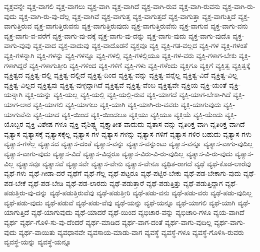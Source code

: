 {ವ್ಯಕ್ತವನ್ನೇ
ವ್ಯಕ್ತ-ವಾಗಲಿ
ವ್ಯಕ್ತ-ವಾಗಲು
ವ್ಯಕ್ತ-ವಾಗಿ
ವ್ಯಕ್ತ-ವಾಗಿದೆ
ವ್ಯಕ್ತ-ವಾಗಿ-ರುವ
ವ್ಯಕ್ತ-ವಾಗಿ-ರುವನು
ವ್ಯಕ್ತ-ವಾಗಿ-ರು-ವುದು
ವ್ಯಕ್ತ-ವಾಗಿ-ರು-ವು-ದೆಲ್ಲ
ವ್ಯಕ್ತ-ವಾಗಿವೆ
ವ್ಯಕ್ತ-ವಾಗುತ್ತ
ವ್ಯಕ್ತ-ವಾಗುತ್ತದೆ
ವ್ಯಕ್ತ-ವಾಗುತ್ತಾ
ವ್ಯಕ್ತ-ವಾಗುತ್ತಿದೆ
ವ್ಯಕ್ತ-ವಾಗುತ್ತಿರುವ
ವ್ಯಕ್ತ-ವಾಗುತ್ತಿರುವನು
ವ್ಯಕ್ತ-ವಾಗುತ್ತಿರುವುದು
ವ್ಯಕ್ತ-ವಾಗುತ್ತಿರುವೆನು
ವ್ಯಕ್ತ-ವಾಗುವ
ವ್ಯಕ್ತ-ವಾಗು-ವನು
ವ್ಯಕ್ತ-ವಾಗು-ವ-ವರೆಗೆ
ವ್ಯಕ್ತ-ವಾಗು-ವು-ದಕ್ಕೆ
ವ್ಯಕ್ತ-ವಾಗು-ವು-ದನ್ನು
ವ್ಯಕ್ತ-ವಾಗು-ವುದು
ವ್ಯಕ್ತ-ವಾಗು-ವುದೊ
ವ್ಯಕ್ತ-ವಾಗು-ವುವು
ವ್ಯಕ್ತ-ವಾದ
ವ್ಯಕ್ತ-ವಾದುವು
ವ್ಯಕ್ತ-ವಾದೊಡನೆ
ವ್ಯಕ್ತವೂ
ವ್ಯಕ್ತಿ
ವ್ಯಕ್ತಿ-ಗತ-ವಲ್ಲದ
ವ್ಯಕ್ತಿ-ಗಳ
ವ್ಯಕ್ತಿ-ಗಳಂತೆ
ವ್ಯಕ್ತಿ-ಗಳನ್ನಾಗಿ
ವ್ಯಕ್ತಿ-ಗಳನ್ನು
ವ್ಯಕ್ತಿ-ಗಳನ್ನೂ
ವ್ಯಕ್ತಿ-ಗಳಲ್ಲಿ
ವ್ಯಕ್ತಿ-ಗಳಲ್ಲಿಯೂ
ವ್ಯಕ್ತಿ-ಗಳ-ವರು
ವ್ಯಕ್ತಿ-ಗಳಾಗ-ಬೇಕು
ವ್ಯಕ್ತಿ-ಗಳಾಗಿದ್ದರೆ
ವ್ಯಕ್ತಿ-ಗಳಾಗುತ್ತೀರಿ
ವ್ಯಕ್ತಿ-ಗಳಿಂದ
ವ್ಯಕ್ತಿ-ಗಳಿಗೆ
ವ್ಯಕ್ತಿ-ಗಳು
ವ್ಯಕ್ತಿ-ಗಳೆಂದು
ವ್ಯಕ್ತಿಗೂ
ವ್ಯಕ್ತಿಗೆ
ವ್ಯಕ್ತಿತ್ವ
ವ್ಯಕ್ತಿತ್ವಕ್ಕೆ
ವ್ಯಕ್ತಿತ್ವದ
ವ್ಯಕ್ತಿತ್ವ-ದಲ್ಲಿ
ವ್ಯಕ್ತಿತ್ವ-ದಲ್ಲಿದೆ
ವ್ಯಕ್ತಿತ್ವ-ದಿಂದ
ವ್ಯಕ್ತಿತ್ವ-ವನ್ನು
ವ್ಯಕ್ತಿತ್ವ-ವನ್ನೆಲ್ಲ
ವ್ಯಕ್ತಿತ್ವ-ವಿದೆ
ವ್ಯಕ್ತಿತ್ವ-ವಿಲ್ಲ
ವ್ಯಕ್ತಿತ್ವ-ವಿಲ್ಲದ
ವ್ಯಕ್ತಿತ್ವವು
ವ್ಯಕ್ತಿತ್ವ-ವುಳ್ಳದ್ದಾಗಿದೆ
ವ್ಯಕ್ತಿತ್ವವೆ
ವ್ಯಕ್ತಿತ್ವ-ವೆಂಬ
ವ್ಯಕ್ತಿತ್ವವೇ
ವ್ಯಕ್ತಿಯ
ವ್ಯಕ್ತಿ-ಯಂತೆ
ವ್ಯಕ್ತಿ-ಯನ್ನಾಗಿ
ವ್ಯಕ್ತಿ-ಯನ್ನು
ವ್ಯಕ್ತಿ-ಯಲ್ಲ
ವ್ಯಕ್ತಿ-ಯಲ್ಲಿ
ವ್ಯಕ್ತಿ-ಯಲ್ಲಿ-ರುವ
ವ್ಯಕ್ತಿ-ಯಾಗದೆ
ವ್ಯಕ್ತಿ-ಯಾಗ-ಬೇಕಾ-ಗಿದೆ
ವ್ಯಕ್ತಿ-ಯಾಗ-ಲಾರ
ವ್ಯಕ್ತಿ-ಯಾಗಲಿ
ವ್ಯಕ್ತಿ-ಯಾಗಲು
ವ್ಯಕ್ತಿ-ಯಾಗಿ
ವ್ಯಕ್ತಿ-ಯಾಗಿ-ರು-ವವರು
ವ್ಯಕ್ತಿ-ಯಾಗುವುದು
ವ್ಯಕ್ತಿ-ಯಾಗುವೆನು
ವ್ಯಕ್ತಿ-ಯಾದ
ವ್ಯಕ್ತಿ-ಯಿಂದ
ವ್ಯಕ್ತಿ-ಯಿಂದಲೂ
ವ್ಯಕ್ತಿಯು
ವ್ಯಕ್ತಿಯೂ
ವ್ಯಕ್ತಿಯೆ
ವ್ಯಕ್ತಿ-ಯೆಂದು
ವ್ಯಕ್ತಿ-ಯೊಬ್ಬರ
ವ್ಯಕ್ತಿ-ವಿಶೇಷ-ಗಳೂ
ವ್ಯಕ್ತಿ-ವೈಶಿಷ್ಟ್ಯ
ವ್ಯಕ್ತ್ಯಾತೀತ-ವಾದುದು
ವ್ಯತಾಸ-ವನ್ನು
ವ್ಯತಿರಿಕ್ತ-ವಾಗಿ
ವ್ಯತಿರಿಕ್ತ-ವಾಗಿದೆ
ವ್ಯತ್ಯಾಸ
ವ್ಯತ್ಯಾಸಕ್ಕೆ
ವ್ಯತ್ಯಾಸಕ್ಕೆಲ್ಲ
ವ್ಯತ್ಯಾಸ-ಗಳ
ವ್ಯತ್ಯಾಸ-ಗಳನ್ನು
ವ್ಯತ್ಯಾಸ-ಗಳಿಗೆ
ವ್ಯತ್ಯಾಸ-ಗಳಿರ-ಬಹುದು
ವ್ಯತ್ಯಾಸ-ಗಳು
ವ್ಯತ್ಯಾಸ-ಗಳೆಲ್ಲ
ವ್ಯತ್ಯಾಸದ
ವ್ಯತ್ಯಾಸ-ದಂತೆ
ವ್ಯತ್ಯಾಸ-ವನ್ನು
ವ್ಯತ್ಯಾಸ-ವನ್ನುಂಟು
ವ್ಯತ್ಯಾಸ-ವನ್ನೂ
ವ್ಯತ್ಯಾಸ-ವಾಗು-ವುದಿಲ್ಲ
ವ್ಯತ್ಯಾಸ-ವಾಗು-ವುದು
ವ್ಯತ್ಯಾಸ-ವಿದೆ
ವ್ಯತ್ಯಾಸ-ವಿದ್ದರೂ
ವ್ಯತ್ಯಾಸ-ವಿರು-ವಿ-ರು-ವುದಿಲ್ಲ
ವ್ಯತ್ಯಾಸ-ವಿ-ರು-ವುದು
ವ್ಯತ್ಯಾಸ-ವಿಲ್ಲ
ವ್ಯತ್ಯಾಸವೂ
ವ್ಯತ್ಯಾಸವೆ
ವ್ಯತ್ಯಾಸವೇ
ವ್ಯತ್ಯಾಸ-ವೇನು
ವ್ಯತ್ಯಾಸ-ವೇನೂ
ವ್ಯಥಿತ-ರಾಗದೆ
ವ್ಯಥೆ
ವ್ಯಥೆ-ಕೊಡ-ಲಾರೆವು
ವ್ಯಥೆ-ಗಳು
ವ್ಯಥೆ-ಗೀಡಾ-ದರೆ
ವ್ಯಥೆಗೆ
ವ್ಯಥೆ-ಗೆಲ್ಲ
ವ್ಯಥೆ-ಪಟ್ಟರೂ
ವ್ಯಥೆ-ಪಟ್ಟಿರ-ಬೇಕು
ವ್ಯಥೆ-ಪಡ-ಬೇಕಾಗು-ವುದು
ವ್ಯಥೆ-ಪಡ-ಬೇಕೆ
ವ್ಯಥೆ-ಪಡ-ಬೇಡಿ
ವ್ಯಥೆ-ಪಡ-ಲಾರದು
ವ್ಯಥೆ-ಪಡುತ್ತಾರೆ
ವ್ಯಥೆ-ಪಡುತ್ತಿತ್ತು
ವ್ಯಥೆ-ಪಡುತ್ತಿದ್ದಾಗ
ವ್ಯಥೆ-ಪಡುತ್ತಿರು-ವು-ದನ್ನು
ವ್ಯಥೆ-ಪಡುತ್ತಿರುವೆವು
ವ್ಯಥೆ-ಪಡುತ್ತೀರಿ
ವ್ಯಥೆ-ಪಡು-ವನು
ವ್ಯಥೆ-ಪಡು-ವರು
ವ್ಯಥೆ-ಪಡು-ವುದಿಲ್ಲ
ವ್ಯಥೆ-ಪಡು-ವುದು
ವ್ಯಥೆ-ಪಡುವೆ
ವ್ಯಥೆ-ಪಡು-ವೆವು
ವ್ಯಥೆ-ಯನ್ನು
ವ್ಯಥೆ-ಯನ್ನೂ
ವ್ಯಥೆ-ಯಾಗಲಿ
ವ್ಯಥೆ-ಯಾಗಿ
ವ್ಯಥೆ-ಯಾಗುತ್ತಿದೆ
ವ್ಯಥೆ-ಯಾಗುವುದು
ವ್ಯಥೆ-ಯಾದರೆ
ವ್ಯಥೆ-ಯಿಂದ
ವ್ಯಭಿಚಾರ-ವನ್ನು
ವ್ಯಭಿಚಾರಿ-ಗಳೂ
ವ್ಯಯ-ವಾಗಿದೆ
ವ್ಯರ್ಥ
ವ್ಯರ್ಥ-ಗೊಳಿ-ಸು-ವು-ದೆಂದರೆ
ವ್ಯರ್ಥ-ಮಾಡಿದ
ವ್ಯರ್ಥ-ವಾಗ-ದಂತೆ
ವ್ಯರ್ಥ-ವಾಗು-ವುದಿಲ್ಲ
ವ್ಯರ್ಥ-ವಾಗು-ವುದು
ವ್ಯರ್ಥ-ವಾಯಿತು
ವ್ಯವಧಾನವೇ
ವ್ಯವಸಾಯ-ಮಾಡು-ವಾಗ
ವ್ಯವಸ್ಥೆ
ವ್ಯವಸ್ಥೆ-ಗಳೂ
ವ್ಯವಸ್ಥೆ-ಗೊಳಿಸಿ-ರುವರು
ವ್ಯವಸ್ಥೆ-ಯನ್ನು
ವ್ಯವಸ್ಥೆ-ಯನ್ನೂ
}
